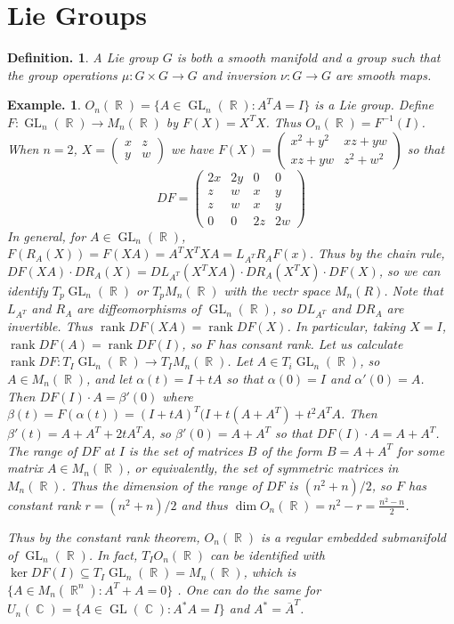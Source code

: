 \documentclass[11pt, a4paper]{memoir}
\DeclareMathOperator{\R}{{\mathbb{R}}}
\DeclareMathOperator{\C}{{\mathbb{C}}}
\theoremstyle{change}
\theoremstyle{plain}
\theoremstyle{nonumberplain}
\newtheorem{definition}{Definition.}
\newtheorem{example}{Example.}
\DeclareMathOperator{\GL}{GL}
\DeclareMathOperator{\rank}{rank}
\numberwithin{equation}{section}
\begin{document}
\section{Lie Groups}
\begin{definition}
    A Lie group $G$ is both a smooth manifold and a group such that the group operations $\mu:G\times G\to G$ and inversion $\nu:G\to G$ are smooth maps.
\end{definition}
\begin{example}
    $O_n(\R)=\{A\in\GL_n(\R):A^TA=I\}$ is a Lie group.
    Define $F:\GL_n(\R)\to M_n(\R)$ by $F(X)=X^TX$.
    Thus $O_n(\R)=F^{-1}(I)$.
    When $n=2$, $X=\begin{pmatrix}x&z\\y&w\end{pmatrix}$ we have $F(X)=\begin{pmatrix}x^2+y^2&xz+yw\\xz+yw&z^2+w^2\end{pmatrix}$ so that
    \begin{equation*}
        DF =
        \begin{pmatrix}
            2x & 2y & 0 & 0\\
            z & w & x & y\\
            z & w & x & y\\
            0 & 0 & 2z & 2w
        \end{pmatrix}
    \end{equation*}
    In general, for $A\in\GL_n(\R)$, $F(R_A(X))=F(XA)=A^TX^TXA=L_{A^T}R_AF(x)$.
    Thus by the chain rule, $DF(XA)\cdot DR_A(X)=DL_{A^T}(X^TXA)\cdot DR_A(X^TX)\cdot DF(X)$, so we can identify $T_p\GL_n(\R)$ or $T_pM_n(\R)$ with the vectr space $M_n(R)$.
    Note that $L_{A^T}$ and $R_A$ are diffeomorphisms of $\GL_n(\R)$, so $DL_{A^T}$ and $DR_A$ are invertible.
    Thus $\rank DF(XA)=\rank DF(X)$.
    In particular, taking $X=I$, $\rank DF(A)=\rank DF(I)$, so $F$ has consant rank.
    Let us calculate $\rank DF:T_I\GL_n(\R)\to T_IM_n(\R)$.
    Let $A\in T_i\GL_n(\R)$, so $A\in M_n(\R)$, and let $\alpha(t)=I+tA$ so that $\alpha(0)=I$ and $\alpha'(0)=A$.
    Then $DF(I)\cdot A=\beta'(0)$ where $\beta(t)=F(\alpha(t))=(I+tA)^T(I+t(A+A^T)+t^2A^TA$.
    Then $\beta'(t)=A+A^T+2tA^TA$, so $\beta'(0)=A+A^T$ so that $DF(I)\cdot A=A+A^T$.
    The range of $DF$ at $I$ is the set of matrices $B$ of the form $B=A+A^T$ for some matrix $A\in M_n(\R)$, or equivalently, the set of symmetric matrices in $M_n(\R)$.
    Thus the dimension of the range of $DF$ is $(n^2+n)/2$, so $F$ has constant rank $r=(n^2+n)/2$ and thus $\dim O_n(\R)=n^2-r=\frac{n^2-n}{2}$.

    Thus by the constant rank theorem, $O_n(\R)$ is a regular embedded submanifold of $\GL_n(\R)$.
    In fact, $T_IO_n(\R)$ can be identified with $\ker DF(I)\subseteq T_I\GL_n(\R)=M_n(\R)$, which is $\{A\in M_n(\R^n):A^T+A=0\}$ .
    One can do the same for $U_n(\C)=\{A\in\GL(\C):A^*A=I\}$ and $A^*=\overline{A}^T$.
\end{example}
\end{document}
